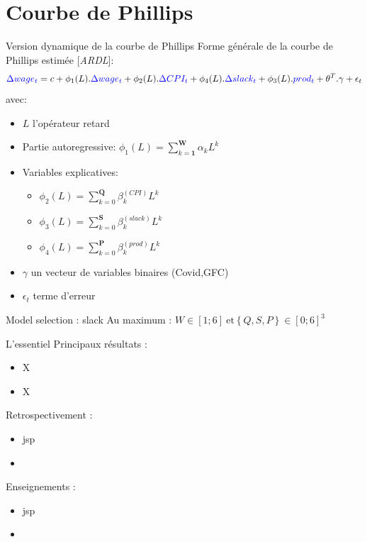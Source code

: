 \documentclass[9pt, xcolor={dvipsnames}]{beamer}
\newcommand{\blue}[1]{\textcolor{blue}{#1}}
\begin{document}
\section{Courbe de Phillips}
\begin{frame}[label=model]{Version dynamique de la courbe de Phillips}
  Forme générale de la courbe de Phillips estimée [\textit{ARDL}]:
  \begin{equation*}
    \blue{\Delta wage_{t}} = c + \phi_{1}(L).\blue{\Delta wage_{t}} + \phi_{2}(L).\blue{\Delta CPI_{t}} + \phi_{4}(L).\blue{\Delta slack_{t}} + \phi_{3}(L).\blue{prod_{t}} + \theta^{T}.\gamma + \epsilon_{t}
  \end{equation*}
  avec:
  \begin{itemize}
    \item $L$ l'opérateur retard
    \item Partie autoregressive: $\phi_{1}(L) = \sum_{k=\mathbf{1}}^{\mathbf{W}}\alpha_k L^{k}$ 
    \item Variables explicatives:
    \begin{itemize}
      \item $\phi_{2}(L) = \sum_{k=0}^{\mathbf{Q}}\beta_k^{(CPI)} L^{k}$
      \item $\phi_{3}(L) = \sum_{k=0}^{\mathbf{S}}\beta_k^{(slack)} L^{k}$
      \item $\phi_{4}(L) = \sum_{k=0}^{\mathbf{P}}\beta_k^{(prod)} L^{k}$
    \end{itemize}
    \item $\gamma$ un vecteur de variables binaires (Covid,GFC)
    \item $\epsilon_{t}$ terme d'erreur
  \end{itemize}
\end{frame}

\begin{frame}[label=est]{Model selection : slack}
  Au maximum : $W\in[1;6]\ \textrm{et} \left\{Q,S,P\right\}\in[0;6]^{3}$
\end{frame}

\begin{frame}{L'essentiel}
  Principaux résultats :
  \begin{itemize}
    \item X
    \item X
  \end{itemize}
  \vspace{.2cm}
  Retrospectivement :
  \begin{itemize}
    \item jsp
    \item 
  \end{itemize}
  \vspace{.2cm}
  Enseignements :
  \begin{itemize}
    \item jsp
    \item 
  \end{itemize}
\end{frame}
\end{document}
